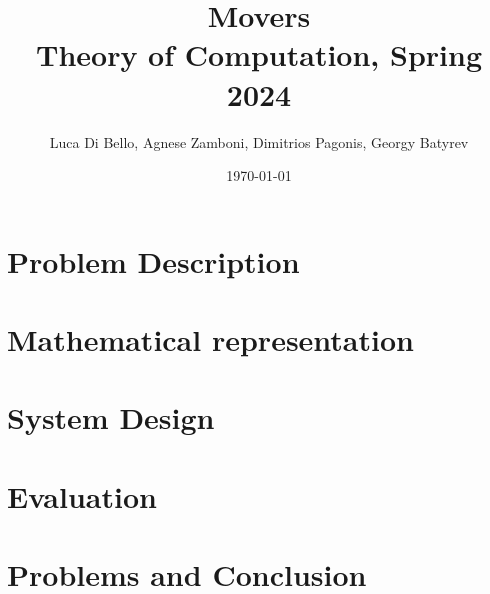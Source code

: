 \documentclass[a4paper, 11pt]{article}
\title{Movers \\[1ex] \large Theory of Computation, Spring 2024}
\author{Luca Di Bello, Agnese Zamboni, Dimitrios Pagonis, Georgy Batyrev}
\date{\today}
\begin{document}
\maketitle
\tableofcontents

\section{Problem Description}

\pagebreak

\section{Mathematical representation}

\pagebreak

\section{System Design}

\pagebreak

\section{Evaluation}

\pagebreak

\section{Problems and Conclusion}


\end{document}
